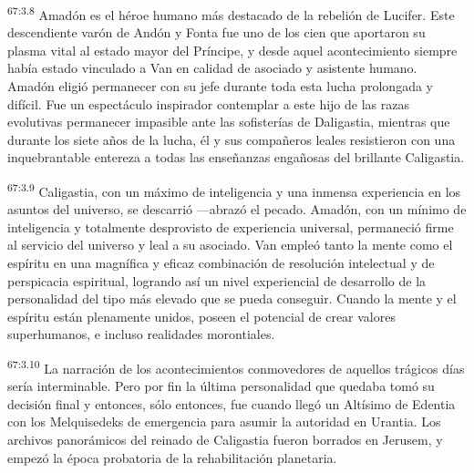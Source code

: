 \par
\textsuperscript{67:3.8} Amadón es el héroe humano más destacado de la rebelión de Lucifer. Este descendiente varón de Andón y Fonta fue uno de los cien que aportaron su plasma vital al estado mayor del Príncipe, y desde aquel acontecimiento siempre había estado vinculado a Van en calidad de asociado y asistente humano. Amadón eligió permanecer con su jefe durante toda esta lucha prolongada y difícil. Fue un espectáculo inspirador contemplar a este hijo de las razas evolutivas permanecer impasible ante las sofisterías de Daligastia, mientras que durante los siete años de la lucha, él y sus compañeros leales resistieron con una inquebrantable entereza a todas las enseñanzas engañosas del brillante Caligastia.

\par
\textsuperscript{67:3.9} Caligastia, con un máximo de inteligencia y una inmensa experiencia en los asuntos del universo, se descarrió ---abrazó el pecado. Amadón, con un mínimo de inteligencia y totalmente desprovisto de experiencia universal, permaneció firme al servicio del universo y leal a su asociado. Van empleó tanto la mente como el espíritu en una magnífica y eficaz combinación de resolución intelectual y de perspicacia espiritual, logrando así un nivel experiencial de desarrollo de la personalidad del tipo más elevado que se pueda conseguir. Cuando la mente y el espíritu están plenamente unidos, poseen el potencial de crear valores superhumanos, e incluso realidades morontiales.

\par
\textsuperscript{67:3.10} La narración de los acontecimientos conmovedores de aquellos trágicos días sería interminable. Pero por fin la última personalidad que quedaba tomó su decisión final y entonces, sólo entonces, fue cuando llegó un Altísimo de Edentia con los Melquisedeks de emergencia para asumir la autoridad en Urantia. Los archivos panorámicos del reinado de Caligastia fueron borrados en Jerusem, y empezó la época probatoria de la rehabilitación planetaria.

